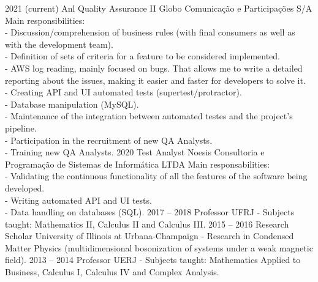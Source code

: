 \documentclass[9pt]{developercv} %
\begin{document}
\begin{entrylist}
	\entry
	{2021 (current)}%
	{Anl Quality Assurance II}
	{Globo Comunicação e Participações S/A}
	{Main responsibilities:\\
- Discussion/comprehension of business rules (with final consumers as well as with the development team).\\
- Definition of sets of criteria for a feature to be considered implemented.\\
- AWS log reading, mainly focused on bugs. That allows me to write a detailed reporting about the issues, making it easier and faster for developers to solve it.\\
- Creating API and UI automated tests (supertest/protractor).\\
- Database manipulation (MySQL).\\
- Maintenance of the integration between automated testes and the project's pipeline.\\
- Participation in the recruitment of new QA Analysts.\\
- Training new QA Analysts.}
	\entry
	{2020}%
	{Test Analyst}
	{Noesis Consultoria e Programação de Sistemas de Informática LTDA}
	{Main responsabilities:\\
- Validating the continuous functionality of all the features of the software being developed.\\
- Writing automated API and UI tests.\\
- Data handling on databases (SQL).}
	\entry
	{2017 -- 2018}
	{Professor}
	{UFRJ}
	{- Subjects taught: Mathematics II, Calculus II and Calculus III.}
	\entry
	{2015 -- 2016}
	{Research Scholar}
	{University of Illinois at Urbana-Champaign}
	{- Research in Condensed Matter Physics (multidimensional bosonization of systems under a weak magnetic field).}
	\entry
	{2013 -- 2014}
	{Professor}
	{UERJ}
	{- Subjects taught: Mathematics Applied to Business, Calculus I, Calculus IV and Complex Analysis.}
\end{entrylist}

\newpage
{}
\end{document}
